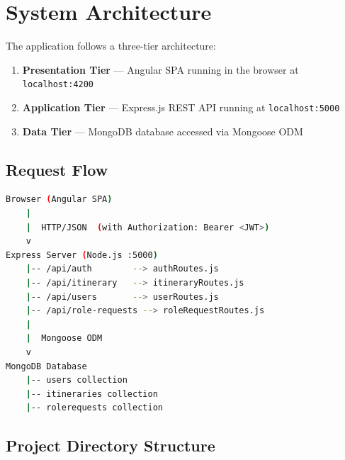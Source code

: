 \documentclass[12pt,a4paper]{article}
\begin{document}
\section{System Architecture}

The application follows a three-tier architecture:

\begin{enumerate}
    \item \textbf{Presentation Tier} — Angular SPA running in the browser at \texttt{localhost:4200}
    \item \textbf{Application Tier} — Express.js REST API running at \texttt{localhost:5000}
    \item \textbf{Data Tier} — MongoDB database accessed via Mongoose ODM
\end{enumerate}

\subsection{Request Flow}

\begin{lstlisting}[language=bash]
Browser (Angular SPA)
    |
    |  HTTP/JSON  (with Authorization: Bearer <JWT>)
    v
Express Server (Node.js :5000)
    |-- /api/auth        --> authRoutes.js
    |-- /api/itinerary   --> itineraryRoutes.js
    |-- /api/users       --> userRoutes.js
    |-- /api/role-requests --> roleRequestRoutes.js
    |
    |  Mongoose ODM
    v
MongoDB Database
    |-- users collection
    |-- itineraries collection
    |-- rolerequests collection
\end{lstlisting}

\subsection{Project Directory Structure}
\end{document}
